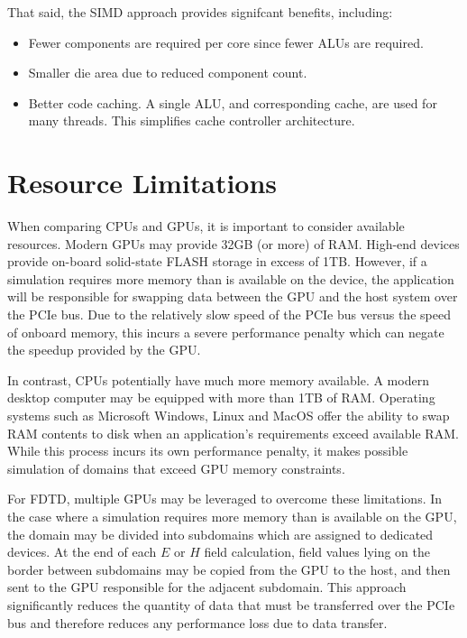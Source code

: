 That said, the SIMD approach provides signifcant benefits, including:

\begin{itemize}
	\item Fewer components are required per core since fewer ALUs are required.
	\item Smaller die area due to reduced component count.
	\item Better code caching. A single ALU, and corresponding cache, are used for many threads. This simplifies cache controller architecture.
\end{itemize}

\section{Resource Limitations}

When comparing CPUs and GPUs, it is important to consider available resources. Modern GPUs may provide 32GB (or more) of RAM.  High-end devices provide on-board solid-state FLASH storage in excess of 1TB. However, if a simulation requires more memory than is available on the device, the application will be responsible for swapping data between the GPU and the host system over the PCIe bus. Due to the relatively slow speed of the PCIe bus versus the speed of onboard memory, this incurs a severe performance penalty which can negate the speedup provided by the GPU. 

In contrast, CPUs potentially have much more memory available. A modern desktop computer may be equipped with more than 1TB of RAM. Operating systems such as Microsoft Windows, Linux and MacOS offer the ability to swap RAM contents to disk when an application's requirements exceed available RAM. While this process incurs its own performance penalty, it makes possible simulation of domains that exceed GPU memory constraints.

\iffalse
I'd like a wrapping up paragraph here to say that for the problem you are looking at GPU's make sense as a choice and why (likely get enough of them that cache memory isn't swapped often...) or some other tie back to the work.
\fi

For FDTD, multiple GPUs may be leveraged to overcome these limitations. In the case where a simulation requires more memory than is available on the GPU, the domain may be divided into subdomains which are assigned to dedicated devices. At the end of each $E$ or $H$ field calculation, field values lying on the border between subdomains may be copied from the GPU to the host, and then sent to the GPU responsible for the adjacent subdomain. This approach significantly reduces the quantity of data that must be transferred over the PCIe bus and therefore reduces any performance loss due to data transfer. 






